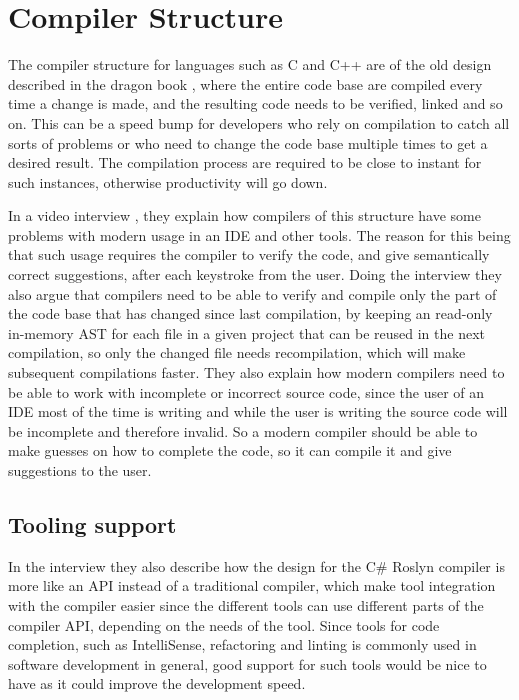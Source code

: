 \section{Compiler Structure}
The compiler structure for languages such as C and C++ are of the old design described in the dragon book \cite{Aho:1986:CPT:6448}, where the entire code base are compiled every time a change is made, and the resulting code needs to be verified, linked and so on.
This can be a speed bump for developers who rely on compilation to catch all sorts of problems or who need to change the code base multiple times to get a desired result. The compilation process are required to be close to instant for such instances, otherwise productivity will go down.

In a video interview \cite{youtubeAndersHejlsberg}, they explain how compilers of this structure have some problems with modern usage in an \ac{IDE} and other tools. The reason for this being that such usage requires the compiler to verify the code, and give semantically correct suggestions, after each keystroke from the user. Doing the interview they also argue that compilers need to be able to verify and compile only the part of the code base that has changed since last compilation, by keeping an read-only in-memory \ac{AST} for each file in a given project that can be reused in the next compilation, so only the changed file needs recompilation, which will make subsequent compilations faster. They also explain how modern compilers need to be able to work with incomplete or incorrect source code, since the user of an \ac{IDE} most of the time is writing and while the user is writing the source code will be incomplete and therefore invalid. So a modern compiler should be able to make guesses on how to complete the code, so it can compile it and give suggestions to the user.

\subsection{Tooling support}
In the interview they also describe how the design for the C\# Roslyn compiler \cite{github:roslyn} is more like an \ac{API} instead of a traditional compiler, which make tool integration with the compiler easier since the different tools can use different parts of the compiler API, depending on the needs of the tool.
Since tools for code completion, such as IntelliSense\cite{micro:intelliSense}, refactoring and linting is commonly used in software development in general, good support for such tools would be nice to have as it could improve the development speed.

